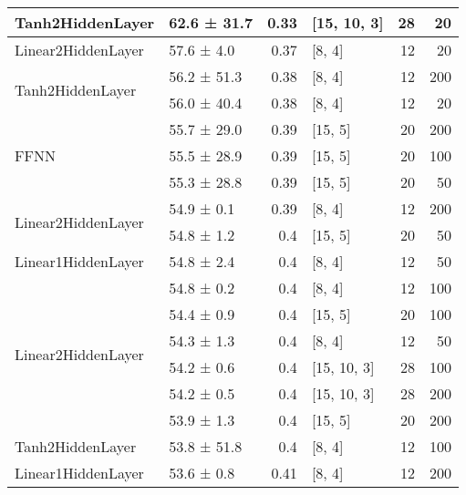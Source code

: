 \begin{table*}[h]
\begin{tabular}{llrlrr}
 \hline
Tanh2HiddenLayer                    & 62.6 ± 31.7 &  0.33 & [15, 10, 3]    &         28 &       20 \\
 \hline
Linear2HiddenLayer                  & 57.6 ± 4.0  &  0.37 & [8, 4]         &         12 &       20 \\
 \hline
\multirow{2}{*}{Tanh2HiddenLayer}   & 56.2 ± 51.3 &  0.38 & [8, 4]         &         12 &      200 \\
                                            & 56.0 ± 40.4 &  0.38 & [8, 4]         &         12 &       20 \\
 \hline
\multirow{3}{*}{FFNN}               & 55.7 ± 29.0 &  0.39 & [15, 5]        &         20 &      200 \\
                                            & 55.5 ± 28.9 &  0.39 & [15, 5]        &         20 &      100 \\
                                            & 55.3 ± 28.8 &  0.39 & [15, 5]        &         20 &       50 \\
 \hline
\multirow{2}{*}{Linear2HiddenLayer} & 54.9 ± 0.1  &  0.39 & [8, 4]         &         12 &      200 \\
                                            & 54.8 ± 1.2  &  0.4  & [15, 5]        &         20 &       50 \\
 \hline
Linear1HiddenLayer                  & 54.8 ± 2.4  &  0.4  & [8, 4]         &         12 &       50 \\
 \hline
\multirow{6}{*}{Linear2HiddenLayer} & 54.8 ± 0.2  &  0.4  & [8, 4]         &         12 &      100 \\
                                            & 54.4 ± 0.9  &  0.4  & [15, 5]        &         20 &      100 \\
                                            & 54.3 ± 1.3  &  0.4  & [8, 4]         &         12 &       50 \\
                                            & 54.2 ± 0.6  &  0.4  & [15, 10, 3]    &         28 &      100 \\
                                            & 54.2 ± 0.5  &  0.4  & [15, 10, 3]    &         28 &      200 \\
                                            & 53.9 ± 1.3  &  0.4  & [15, 5]        &         20 &      200 \\
 \hline
Tanh2HiddenLayer                    & 53.8 ± 51.8 &  0.4  & [8, 4]         &         12 &      100 \\
 \hline
\multirow{2}{*}{Linear1HiddenLayer} & 53.6 ± 0.8  &  0.41 & [8, 4]         &         12 &      200 \\

\end{tabular}
\end{table*}

